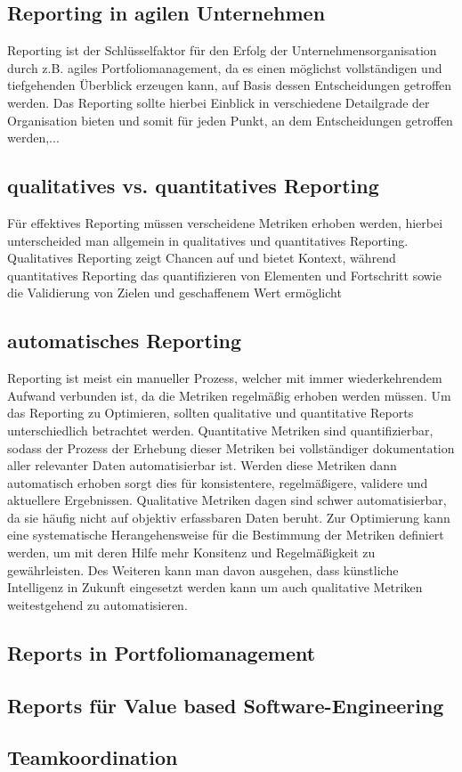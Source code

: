 \subsection{Reporting in agilen Unternehmen}
Reporting ist der Schlüsselfaktor für den Erfolg der Unternehmensorganisation durch z.B. agiles Portfoliomanagement, da es einen möglichst vollständigen und tiefgehenden Überblick erzeugen kann, auf Basis dessen Entscheidungen getroffen werden. \cite{}
Das Reporting sollte hierbei Einblick in verschiedene Detailgrade der Organisation bieten und somit für jeden Punkt, an dem Entscheidungen getroffen werden,...
\subsection{qualitatives vs. quantitatives Reporting}
Für effektives Reporting müssen verscheidene Metriken erhoben werden, hierbei unterscheided man allgemein in qualitatives und quantitatives Reporting.
Qualitatives Reporting zeigt Chancen auf und bietet Kontext, während quantitatives Reporting das quantifizieren von Elementen und Fortschritt sowie die Validierung von Zielen und geschaffenem Wert ermöglicht \cite{}
\subsection{automatisches Reporting}
Reporting ist meist ein manueller Prozess, welcher mit immer wiederkehrendem Aufwand verbunden ist, da die Metriken regelmäßig erhoben werden müssen. Um das Reporting zu Optimieren, sollten qualitative und quantitative Reports unterschiedlich betrachtet werden. 
Quantitative Metriken sind quantifizierbar, sodass der Prozess der Erhebung dieser Metriken bei vollständiger dokumentation aller relevanter Daten automatisierbar ist. Werden diese Metriken dann automatisch erhoben sorgt dies für konsistentere, regelmäßigere, validere und aktuellere Ergebnissen. 
Qualitative Metriken dagen sind schwer automatisierbar, da sie häufig nicht auf objektiv erfassbaren Daten beruht. Zur Optimierung kann eine systematische Herangehensweise für die Bestimmung der Metriken definiert werden, um mit deren Hilfe  mehr Konsitenz und Regelmäßigkeit zu gewährleisten. Des Weiteren kann man davon ausgehen, dass künstliche Intelligenz in Zukunft eingesetzt werden kann um auch qualitative Metriken weitestgehend zu automatisieren.

\subsection{Reports in Portfoliomanagement}


\subsection{Reports für Value based Software-Engineering}


\subsection{Teamkoordination}

